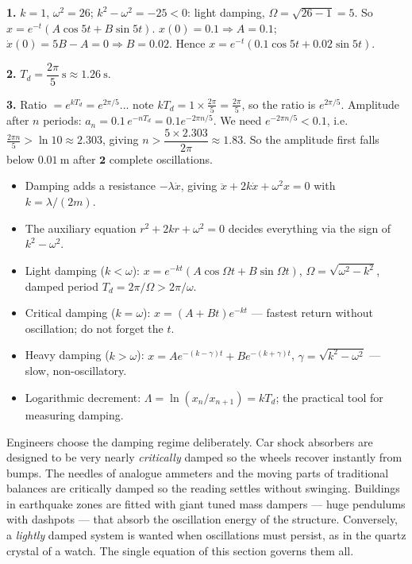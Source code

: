 \documentclass[11pt]{article}
\begin{document}
\begin{corrige}[Exercise 1]
\textbf{1.} $k = 1$, $\omega^{2} = 26$; $k^{2} - \omega^{2} = -25 < 0$: light damping, $\Omega = \sqrt{26-1} = 5$. So $x = e^{-t}(A\cos 5t + B\sin 5t)$. $x(0) = 0.1 \Rightarrow A = 0.1$; $\dot{x}(0) = 5B - A = 0 \Rightarrow B = 0.02$. Hence $x = e^{-t}(0.1\cos 5t + 0.02\sin 5t)$.

\textbf{2.} $T_{d} = \dfrac{2\pi}{5}\ \mathrm{s} \approx 1.26\ \mathrm{s}$.

\textbf{3.} Ratio $= e^{kT_{d}} = e^{2\pi/5}$... note $kT_d = 1 \times \tfrac{2\pi}{5} = \tfrac{2\pi}{5}$, so the ratio is $e^{2\pi/5}$. Amplitude after $n$ periods: $a_n = 0.1\,e^{-nT_d} = 0.1e^{-2\pi n/5}$. We need $e^{-2\pi n/5} < 0.1$, i.e.\ $\tfrac{2\pi n}{5} > \ln 10 \approx 2.303$, giving $n > \dfrac{5 \times 2.303}{2\pi} \approx 1.83$. So the amplitude first falls below $0.01\ \mathrm{m}$ after $\mathbf{2}$ complete oscillations.
\end{corrige}

\begin{aretenir}
\begin{itemize}
\item Damping adds a resistance $-\lambda\dot{x}$, giving $\ddot{x} + 2k\dot{x} + \omega^{2}x = 0$ with $k = \lambda/(2m)$.
\item The auxiliary equation $r^{2} + 2kr + \omega^{2} = 0$ decides everything via the sign of $k^{2} - \omega^{2}$.
\item Light damping ($k<\omega$): $x = e^{-kt}(A\cos\Omega t + B\sin\Omega t)$, $\Omega = \sqrt{\omega^{2}-k^{2}}$, damped period $T_d = 2\pi/\Omega > 2\pi/\omega$.
\item Critical damping ($k=\omega$): $x = (A+Bt)e^{-kt}$ — fastest return without oscillation; do not forget the $t$.
\item Heavy damping ($k>\omega$): $x = Ae^{-(k-\gamma)t} + Be^{-(k+\gamma)t}$, $\gamma = \sqrt{k^{2}-\omega^{2}}$ — slow, non-oscillatory.
\item Logarithmic decrement: $\Lambda = \ln(x_n/x_{n+1}) = kT_d$; the practical tool for measuring damping.
\end{itemize}
\end{aretenir}

\begin{savaistu}
Engineers choose the damping regime deliberately. Car shock absorbers are designed to be very nearly \emph{critically} damped so the wheels recover instantly from bumps. The needles of analogue ammeters and the moving parts of traditional balances are critically damped so the reading settles without swinging. Buildings in earthquake zones are fitted with giant tuned mass dampers — huge pendulums with dashpots — that absorb the oscillation energy of the structure. Conversely, a \emph{lightly} damped system is wanted when oscillations must persist, as in the quartz crystal of a watch. The single equation of this section governs them all.
\end{savaistu}
\end{document}
